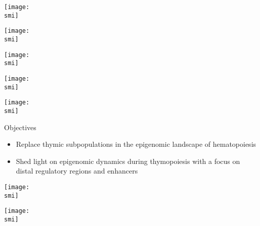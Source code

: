 \documentclass[10pt, notes]{beamer}
\def\smi{out/ln/updir/mw-gcthesis-oral/library.bib}
\begin{document}
\begin{frame}[plain]
  \def\smi{out/ln/updir/mw-gcthesis-oral/ink/thymus/1.pdf}
    \texttt{[image: \\smi]}
\end{frame}
\begin{frame}[plain]
  \def\smi{out/ln/updir/mw-gcthesis-oral/ink/thymus/2.pdf}
    \texttt{[image: \\smi]}
\end{frame}
\begin{frame}[plain]
  \def\smi{out/ln/updir/mw-gcthesis-oral/ink/thymus/3.pdf}
    \texttt{[image: \\smi]}
\end{frame}
\begin{frame}[plain]
  \def\smi{out/ln/updir/mw-gcthesis-oral/ink/thymus/4.pdf}
    \texttt{[image: \\smi]}
\end{frame}
\begin{frame}[plain]
  \def\smi{out/ln/updir/mw-gcthesis-oral/ink/thymus/5.pdf}
    \texttt{[image: \\smi]}
\end{frame}
\begin{frame}[plain]{Objectives}
  \begin{itemize}
    \item Replace thymic subpopulations in the epigenomic landscape of hematopoiesis
    \item Shed light on epigenomic dynamics during thymopoiesis with a focus on distal regulatory regions and enhancers
  \end{itemize}
\end{frame}
\begin{frame}[plain]
  \def\smi{out/ln/updir/mw-gcthesis-oral/ink/tSNE-WGBS.pdf}
  \texttt{[image: \\smi]}
\end{frame}
\begin{frame}[plain]
  \def\smi{out/ln/updir/mw-gcthesis-oral/ink/chromatin-states/matrix-model.pdf}
    \texttt{[image: \\smi]}
\end{frame}
\end{document}
